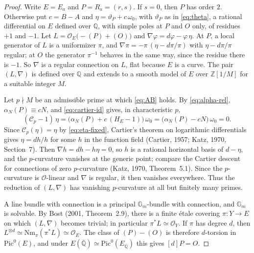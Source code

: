 \documentclass[11pt,a4paper]{article}
\numberwithin{equation}{section}
\theoremstyle{plain}
\theoremstyle{definition}
\newcommand{\Q}{\mathbb{Q}}
\newcommand{\Z}{\mathbb{Z}}
\begin{document}
\begin{proof}
Write $E=E_a$ and $P=R_a=(r,s)$. If $s=0$, then $P$ has order $2$. Otherwise put $c=B-A$ and $\eta=\vartheta_P+c\,\omega_0$, with $\vartheta_P$ as in \eqref{eq:theta}, a rational differential on $E$ defined over $\Q$, with simple poles at $P$ and $O$ only, of residues $+1$ and $-1$. Let $L=\mathcal O_E\bigl(-(P)+(O)\bigr)$ and $\nabla\varphi=d\varphi-\varphi\,\eta$. At $P$, a local generator of $L$ is a uniformizer $\pi$, and $\nabla\pi=-\pi\,(\eta-d\pi/\pi)$ with $\eta-d\pi/\pi$ regular; at $O$ the generator $\pi^{-1}$ behaves in the same way, since the residue there is $-1$. So $\nabla$ is a regular connection on $L$, flat because $E$ is a curve. The pair $(L,\nabla)$ is defined over $\Q$ and extends to a smooth model of $E$ over $\Z[1/M]$ for a suitable integer $M$.

Let $p\nmid M$ be an admissible prime at which \eqref{eq:AB} holds. By \eqref{eq:alpha-rel}, $\alpha_N(P)\equiv cN$, and \eqref{eq:cartier-id} gives, in characteristic $p$,
\begin{equation}\label{eq:eta-fixed}
(\mathcal C_p-1)\,\eta=\bigl(\alpha_N(P)+c\,(H_E-1)\bigr)\,\omega_0=\bigl(\alpha_N(P)-cN\bigr)\,\omega_0=0 .
\end{equation}
Since $\mathcal C_p(\eta)=\eta$ by \eqref{eq:eta-fixed}, Cartier's theorem on logarithmic differentials gives $\eta=dh/h$ for some $h$ in the function field (Cartier, 1957; Katz, 1970, Section~7). Then $\nabla h=dh-h\eta=0$, so $h$ is a rational horizontal basis of $d-\eta$, and the $p$-curvature vanishes at the generic point; compare the Cartier descent for connections of zero $p$-curvature (Katz, 1970, Theorem~5.1). Since the $p$-curvature is $\mathcal O$-linear and $\nabla$ is regular, it then vanishes everywhere. Thus the reduction of $(L,\nabla)$ has vanishing $p$-curvature at all but finitely many primes.

A line bundle with connection is a principal $\mathbb G_m$-bundle with connection, and $\mathbb G_m$ is solvable. By Bost (2001, Theorem~2.9), there is a finite \'etale covering $\pi:Y\to E$ on which $(L,\nabla)$ becomes trivial; in particular $\pi^*L\simeq\mathcal O_Y$. If $\pi$ has degree $d$, then $L^{\otimes d}\simeq\mathrm{Nm}_\pi(\pi^*L)\simeq\mathcal O_E$. The class of $(P)-(O)$ is therefore $d$-torsion in $\mathrm{Pic}^0(E)$, and under $E(\overline{\Q})\simeq\mathrm{Pic}^0(E_{\overline{\Q}})$ this gives $[d]P=O$.
\end{proof}
\end{document}
